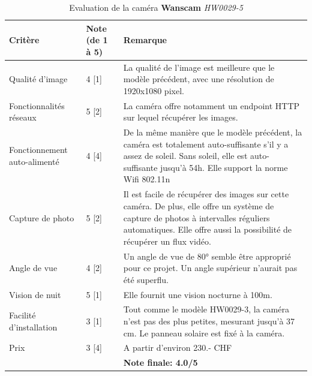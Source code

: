 \begin{table}[H]
    \centering
    \caption{Evaluation de la caméra \textbf{Wanscam} \textit{HW0029-5}}
    \label{cam:wan5_eval}
    \begin{tabular}{@{}llp{8cm}@{}}
        \toprule
        Critère                      & Note (de 1 à 5) & Remarque                                           \\ \midrule
        Qualité d'image              & 4 {[}1{]}       & La qualité de l'image est meilleure que le modèle précédent, avec une résolution de 1920x1080 pixel.                                                              \\ [0.8ex]
        Fonctionnalités réseaux      & 5 {[}2{]}       & La caméra offre notamment un endpoint HTTP sur lequel récupérer les images.                                                                                       \\ [0.8ex]
        Fonctionnement auto-alimenté & 4 {[}4{]}       & De la même manière que le modèle précédent, la caméra est totalement auto-suffisante s'il y a assez de soleil. Sans soleil, elle est auto-suffisante jusqu'à 54h. Elle support la norme Wifi 802.11n \\ [0.8ex]
        Capture de photo             & 5 {[}2{]}       & Il est facile de récupérer des images sur cette caméra. De plus, elle offre un système de capture de photos à intervalles réguliers automatiques. Elle offre aussi la possibilité de récupérer un flux vidéo.                  \\ [0.8ex]
        Angle de vue                 & 4 {[}2{]}       & Un angle de vue de 80° semble être approprié pour ce projet. Un angle supérieur n'aurait pas été superflu.                                                        \\ [0.8ex]
        Vision de nuit               & 5 {[}1{]}       & Elle fournit une vision nocturne à 100m.                                                                                                                          \\ [0.8ex]
        Facilité d'installation      & 3 {[}1{]}       & Tout comme le modèle HW0029-3, la caméra n'est pas des plus petites, mesurant jusqu'à 37 cm. Le panneau solaire est fixé à la caméra.                             \\ [0.8ex]
        Prix                         & 3 {[}4{]}       & A partir d'environ 230.- CHF   \\ \midrule
        && \textbf{Note finale: 4.0/5} \\ \bottomrule
    \end{tabular}
\end{table}

